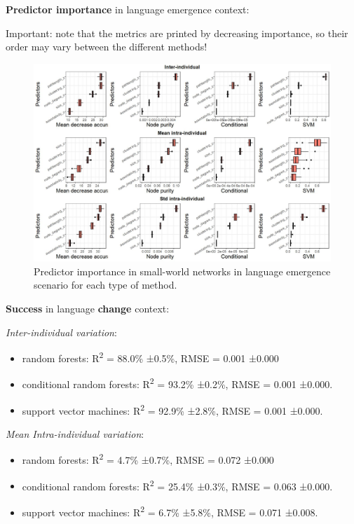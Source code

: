 \documentclass[
]{article}
\providecommand{\tightlist}{%
  \setlength{\itemsep}{0pt}\setlength{\parskip}{0pt}}
\begin{document}
\textbf{Predictor importance} in language emergence context:

Important: note that the metrics are printed by decreasing importance,
so their order may vary between the different methods!

\begin{figure}[!H]

{\centering \includegraphics{./Figures/unnamed-chunk-101-1} 

}

\caption{Predictor importance in small-world networks in language emergence scenario for each type of method.}\label{fig:unnamed-chunk-101}
\end{figure}

\textbf{Success} in language \textbf{change} context:

\emph{Inter-individual variation}:

\begin{itemize}
\tightlist
\item
  random forests: R\textsuperscript{2} = 88.0\% ±0.5\%, RMSE = 0.001
  ±0.000
\item
  conditional random forests: R\textsuperscript{2} = 93.2\% ±0.2\%, RMSE
  = 0.001 ±0.000.
\item
  support vector machines: R\textsuperscript{2} = 92.9\% ±2.8\%, RMSE =
  0.001 ±0.000.
\end{itemize}

\emph{Mean Intra-individual variation}:

\begin{itemize}
\tightlist
\item
  random forests: R\textsuperscript{2} = 4.7\% ±0.7\%, RMSE = 0.072
  ±0.000
\item
  conditional random forests: R\textsuperscript{2} = 25.4\% ±0.3\%, RMSE
  = 0.063 ±0.000.
\item
  support vector machines: R\textsuperscript{2} = 6.7\% ±5.8\%, RMSE =
  0.071 ±0.008.
\end{itemize}
\end{document}
